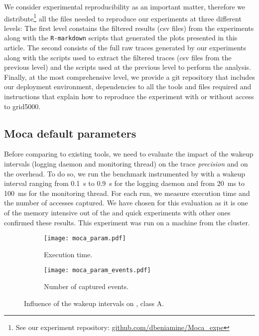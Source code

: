 We consider experimental reproducibility as an important matter, therefore we
distribute\footnote{See our experiment repository:
    \href{https://github.com/dbeniamine/Moca_expe}{github.com/dbeniamine/Moca\_expe}}
all the files needed to reproduce our experiments at three different levels:
The first level constains the filtered results (csv files) from the
experiments along with the \texttt{R-markdown} scripts that generated the
plots presented in this article.
The second consists of the full raw traces generated by our experiments along
with the scripts used to extract the filtered traces (csv files from the
previous level) and the scripts used at the previous level to perform the
analysis.
Finally, at the most comprehensive level, we provide a git repository that
includes our deployment environment, dependencies to all the tools and files
required and instructions that explain how to reproduce the experiment with or
without access to grid5000.


\subsection{Moca default parameters}
\label{sec:expe-param}

Before comparing \Moca to existing tools, we need to evaluate the impact of
the wakeup intervals (logging daemon and monitoring thread) on the trace
\emph{precision} and on the overhead. To do so, we run the \IS benchmark instrumented by \Moca with
a wakeup interval ranging from \SI{0.1}{s} to  \SI{0.9}{s} for the logging daemon and from \SI{20}{ms} to
\SI{100}{ms} for the monitoring thread. For each run, we measure \IS execution time and the number of
accesses captured. We have chosen \IS for this evaluation as it is one of the memory intensive out of the \NPB
and quick experiments with other ones confirmed these results. This experiment was
run on a machine from the \Edel cluster.

\begin{figure}[htb]
    \centering
    \begin{subfigure}{.9\linewidth}
        \texttt{[image: moca\_param.pdf]}
        \caption{Execution time.}
        \label{fig:param_time}
    \end{subfigure}
    \begin{subfigure}{.9\linewidth}
        \texttt{[image: moca\_param\_events.pdf]}
        \caption{Number of captured events.}
        \label{fig:param_evts}
    \end{subfigure}
    \caption{Influence of the wakeup intervals on \IS, class A.}
    \label{fig:param}
\end{figure}

